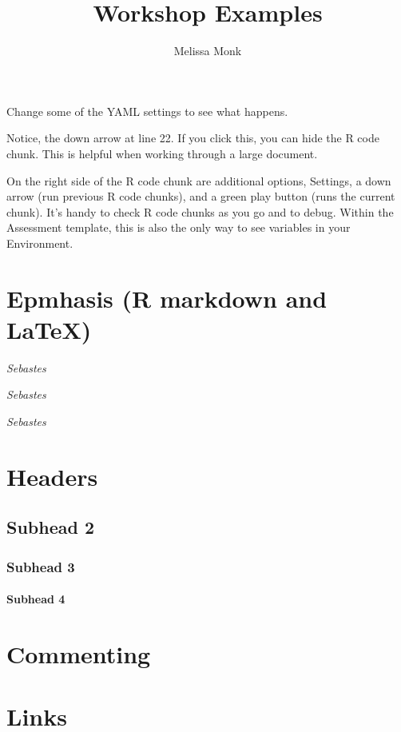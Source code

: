 \documentclass[12pt,]{article}
\title{Workshop Examples}
\author{Melissa Monk}
\date{}
\let\oldparagraph\paragraph
\renewcommand{\paragraph}[1]{\oldparagraph{#1}\mbox{}}
\begin{document}
\maketitle

{
\setcounter{tocdepth}{4}
\tableofcontents
}
Change some of the YAML settings to see what happens.

Notice, the down arrow at line 22. If you click this, you can hide the R
code chunk. This is helpful when working through a large document.

On the right side of the R code chunk are additional options, Settings,
a down arrow (run previous R code chunks), and a green play button (runs
the current chunk). It's handy to check R code chunks as you go and to
debug. Within the Assessment template, this is also the only way to see
variables in your Environment.

\section{Epmhasis (R markdown and
LaTeX)}\label{epmhasis-r-markdown-and-latex}

\emph{Sebastes}

\emph{Sebastes}

\textit{Sebastes}

\section{Headers}\label{headers}

\subsection{Subhead 2}\label{subhead-2}

\subsubsection{Subhead 3}\label{subhead-3}

\paragraph{Subhead 4}\label{subhead-4}

\section{Commenting}\label{commenting}

\section{Links}\label{links}
\end{document}
